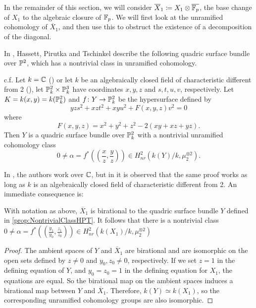 In the remainder of this section, we will consider $\overline{X}_1 \coloneqq X_1 \otimes \overline{\F_p}$, the base change of $X_1$ to the algebraic closure of $\F_p$. We will first look at the unramified cohomology of $\overline{X}_1$, and then use this to obstruct the existence of a decomposition of the diagonal.

In \cite{HPTActa}, Hassett, Pirutka and Tschinkel describe the following quadric surface bundle over $\P^2$, which has a nontrivial class in unramified cohomology. 
\begin{proposition}{{c.f. \cite[Proposition 10]{HPTActa}}}
	\label{prop:NontrivialClassHPT}
	Let $k=\C$ (\cite{HPTActa}) or let $k$ be an algebraically closed field of characteristic different from 2 (\cite{SchreiederCyclesAndRationality}), let $\P_k^2 \times \P_k^3$ have coordinates $x,y,z$ and $s,t,u,v$, respectively. Let $K = k(x,y) = k(\P_k^2)$ and $f \from Y \to \P_k^2$ be the hypersurface defined by
	\[yzs^2 + xzt^2 + xyu^2 + F(x,y,z)v^2 = 0\]
	where
	\[F(x,y,z)=x^2+y^2+z^2-2(xy+xz+yz).\]
	Then $Y$ is a quadric surface bundle over $\P_k^2$ with a nontrivial unramified cohomology class
 \[0 \neq \alpha = f^*\left( \left(\frac{x}{z},\frac{y}{z}\right) \right) \in H_{nr}^2(k(Y)/k,\mu_2^{\otimes 2}).\] 
\end{proposition}
In \cite{HPTActa}, the authors work over $\C$, but in \cite[Proposition 9.6]{SchreiederCyclesAndRationality} it is observed that the same proof works as long as $k$ is an algebraically closed field of characteristic different from 2. An immediate consequence is:
\begin{corollary}
	\label{cor:AlphaNonTriv}
	With notation as above, $\overline{X}_1$ is birational to the quadric surface bundle $Y$ defined in \cref{prop:NontrivialClassHPT}. It follows that there is a nontrivial class $0 \neq \alpha = f^*((\frac{y_1}{y_0},\frac{z_1}{z_0})) \in H_{nr}^2(k(X_1)/k,\mu_2^{\otimes 2})$
\end{corollary}

\begin{proof}
The ambient spaces of $Y$ and $\overline{X}_1$ are birational and are isomorphic on the open sets defined by $z \neq 0$ and $y_0,z_0 \neq 0$, respectively. If we set $z=1$ in the defining equation of $Y$, and $y_0=z_0=1$ in the defining equation for $X_1$, the equations are equal. So the birational map on the ambient spaces induces a birational map between $Y$ and $\overline{X}_1$. Therefore, $k(Y) \simeq k(X_1)$, so the corresponding unramified cohomology groups are also isomorphic.
\end{proof}

